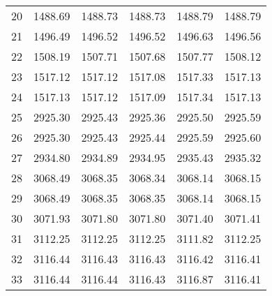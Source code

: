 \documentclass[10pt,oneside]{article}
\begin{document}
\begin{table}[h!]
\begin{tabular}{cccccc}
20 &   1488.69 & 1488.73 &    1488.73 & 1488.79 &   1488.79 \\
21 &   1496.49 & 1496.52 &    1496.52 & 1496.63 &   1496.56 \\
22 &   1508.19 & 1507.71 &    1507.68 & 1507.77 &   1508.12 \\
23 &   1517.12 & 1517.12 &    1517.08 & 1517.33 &   1517.13 \\
24 &   1517.13 & 1517.12 &    1517.09 & 1517.34 &   1517.13 \\
25 &   2925.30 & 2925.43 &    2925.36 & 2925.50 &   2925.59 \\
26 &   2925.30 & 2925.43 &    2925.44 & 2925.59 &   2925.60 \\
27 &   2934.80 & 2934.89 &    2934.95 & 2935.43 &   2935.32 \\
28 &   3068.49 & 3068.35 &    3068.34 & 3068.14 &   3068.15 \\
29 &   3068.49 & 3068.35 &    3068.35 & 3068.14 &   3068.15 \\
30 &   3071.93 & 3071.80 &    3071.80 & 3071.40 &   3071.41 \\
31 &   3112.25 & 3112.25 &    3112.25 & 3111.82 &   3112.25 \\
32 &   3116.44 & 3116.43 &    3116.43 & 3116.42 &   3116.41 \\
33 &   3116.44 & 3116.44 &    3116.43 & 3116.87 &   3116.41 \\
\bottomrule
\end{tabular}
\end{table}
\end{document}
